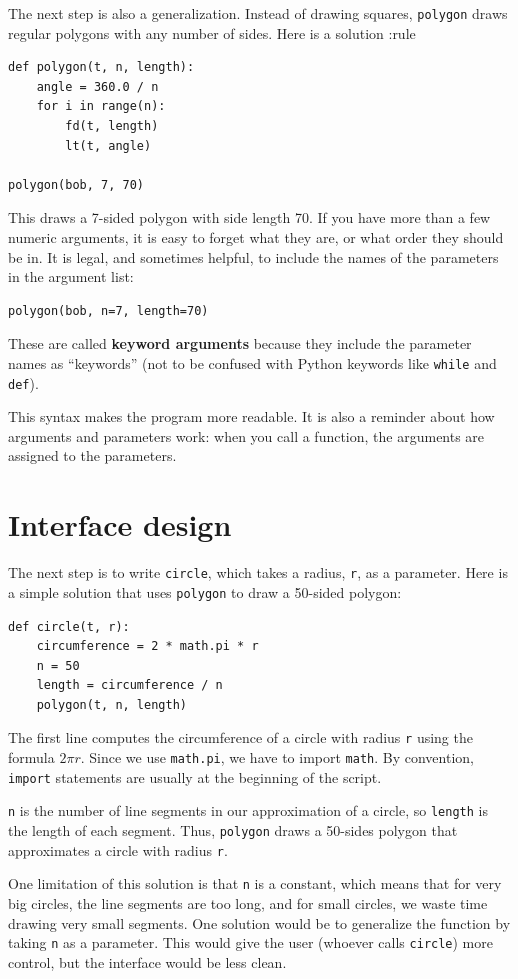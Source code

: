 \documentclass[10pt]{book}
\begin{document}
The next step is also a generalization.  Instead of drawing
squares, {\tt polygon} draws regular polygons with any number of
sides.  Here is a solution
:rule 
\begin{verbatim}
def polygon(t, n, length):
    angle = 360.0 / n
    for i in range(n):
        fd(t, length)
        lt(t, angle)

polygon(bob, 7, 70)
\end{verbatim}
%
This draws a 7-sided polygon with side length 70.  If you have
more than a few numeric arguments, it is easy to forget what they
are, or what order they should be in.  It is legal, and sometimes
helpful, to include the names of the parameters in the argument
list:

\begin{verbatim}
polygon(bob, n=7, length=70)
\end{verbatim}
%
These are called {\bf keyword arguments} because they include
the parameter names as ``keywords'' (not to be confused with
Python keywords like {\tt while} and {\tt def}).

This syntax makes the program more readable.  It is also a reminder
about how arguments and parameters work: when you call a function, the
arguments are assigned to the parameters.


\section{Interface design}

The next step is to write {\tt circle}, which takes a radius,
{\tt r}, as a parameter.  Here is a simple solution that uses
{\tt polygon} to draw a 50-sided polygon:

\begin{verbatim}
def circle(t, r):
    circumference = 2 * math.pi * r
    n = 50
    length = circumference / n
    polygon(t, n, length)
\end{verbatim}
%
The first line computes the circumference of a circle with radius
{\tt r} using the formula $2 \pi r$.  Since we use {\tt math.pi}, we
have to import {\tt math}.  By convention, {\tt import} statements
are usually at the beginning of the script.

{\tt n} is the number of line segments in our approximation of a circle,
so {\tt length} is the length of each segment.  Thus, {\tt polygon}
draws a 50-sides polygon that approximates a circle with radius {\tt r}.

One limitation of this solution is that {\tt n} is a constant, which
means that for very big circles, the line segments are too long, and
for small circles, we waste time drawing very small segments.  One
solution would be to generalize the function by taking {\tt n} as
a parameter.  This would give the user (whoever calls {\tt circle})
more control, but the interface would be less clean.
\end{document}
